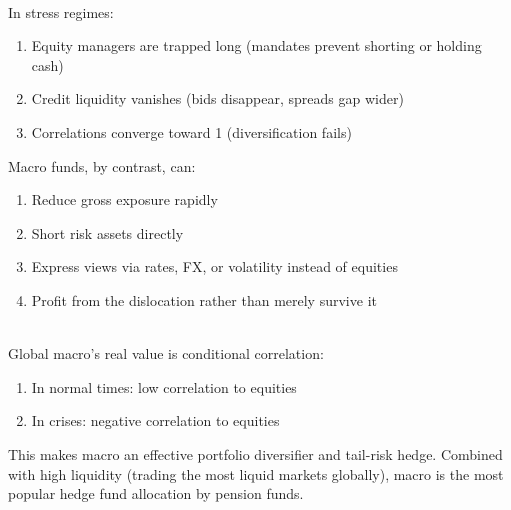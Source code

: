\begin{remark} \\
In stress regimes:
\begin{enumerate}[label=\roman*.]
\setlength{\itemsep}{0pt}
\item Equity managers are trapped long (mandates prevent shorting or holding cash)
\item Credit liquidity vanishes (bids disappear, spreads gap wider)
\item Correlations converge toward 1 (diversification fails)
\end{enumerate}
Macro funds, by contrast, can:
\begin{enumerate}[label=\roman*.]
\setlength{\itemsep}{0pt}
\item Reduce gross exposure rapidly
\item Short risk assets directly
\item Express views via rates, FX, or volatility instead of equities
\item Profit from the dislocation rather than merely survive it
\end{enumerate}
\end{remark}

\begin{remark} \\
Global macro's real value is conditional correlation:
\begin{enumerate}[label=\roman*.]
\setlength{\itemsep}{0pt}
\item In normal times: low correlation to equities
\item In crises: negative correlation to equities
\end{enumerate}
This makes macro an effective portfolio diversifier and tail-risk hedge. Combined with high liquidity (trading the most liquid markets globally), macro is the most popular hedge fund allocation by pension funds.
\end{remark}

